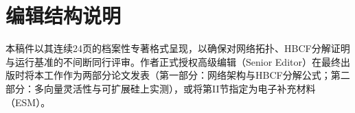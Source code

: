 \documentclass[11pt, journal, onecolumn]{IEEEtran}
\begin{document}
\section*{编辑结构说明}
本稿件以其连续24页的档案性专著格式呈现，以确保对网络拓扑、HBCF分解证明与运行基准的不间断同行评审。作者正式授权高级编辑（Senior Editor）在最终出版时将本工作作为两部分论文发表（第一部分：网络架构与HBCF分解公式；第二部分：多向量灵活性与可扩展硅上实测），或将第II节指定为电子补充材料（ESM）。



\end{document}
